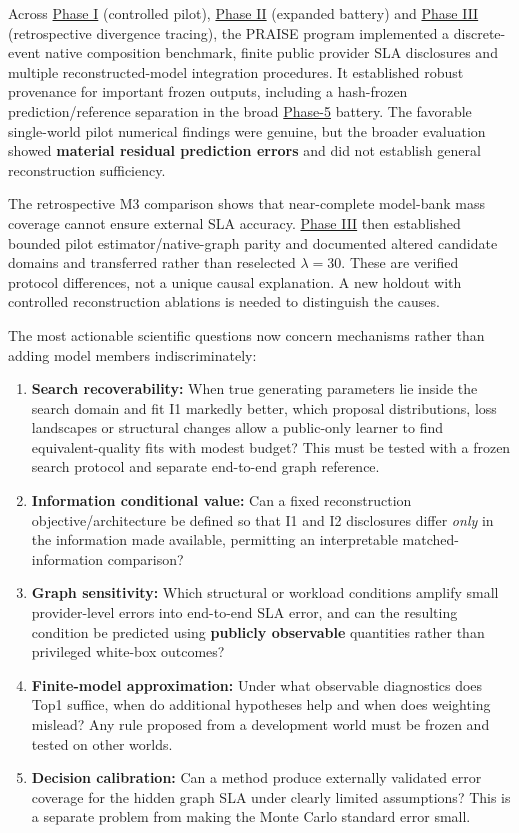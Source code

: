 \documentclass[10pt,a4paper]{article}
\begin{document}
Across \hyperref[app:experiment-stages]{Phase I} (controlled pilot), \hyperref[app:experiment-stages]{Phase II} (expanded battery) and \hyperref[app:experiment-stages]{Phase III} (retrospective divergence tracing), the PRAISE program implemented a discrete-event native composition benchmark, finite public provider SLA disclosures and multiple reconstructed-model integration procedures. It established robust provenance for important frozen outputs, including a hash-frozen prediction/reference separation in the broad \hyperref[app:experiment-stages]{Phase-5} battery. The favorable single-world pilot numerical findings were genuine, but the broader evaluation showed \textbf{material residual prediction errors} and did not establish general reconstruction sufficiency.

The retrospective M3 comparison shows that near-complete model-bank mass coverage cannot ensure external SLA accuracy. \hyperref[app:experiment-stages]{Phase III} then established bounded pilot estimator/native-graph parity and documented altered candidate domains and transferred rather than reselected $\lambda=30$. These are verified protocol differences, not a unique causal explanation. A new holdout with controlled reconstruction ablations is needed to distinguish the causes.

The most actionable scientific questions now concern mechanisms rather than adding model members indiscriminately:

\begin{enumerate}
\item \textbf{Search recoverability:} When true generating parameters lie inside the search domain and fit I1 markedly better, which proposal distributions, loss landscapes or structural changes allow a public-only learner to find equivalent-quality fits with modest budget? This must be tested with a frozen search protocol and separate end-to-end graph reference.
\item \textbf{Information conditional value:} Can a fixed reconstruction objective/architecture be defined so that I1 and I2 disclosures differ \emph{only} in the information made available, permitting an interpretable matched-information comparison?
\item \textbf{Graph sensitivity:} Which structural or workload conditions amplify small provider-level errors into end-to-end SLA error, and can the resulting condition be predicted using \textbf{publicly observable} quantities rather than privileged white-box outcomes?
\item \textbf{Finite-model approximation:} Under what observable diagnostics does Top1 suffice, when do additional hypotheses help and when does weighting mislead? Any rule proposed from a development world must be frozen and tested on other worlds.
\item \textbf{Decision calibration:} Can a method produce externally validated error coverage for the hidden graph SLA under clearly limited assumptions? This is a separate problem from making the Monte Carlo standard error small.
\end{enumerate}
\end{document}
